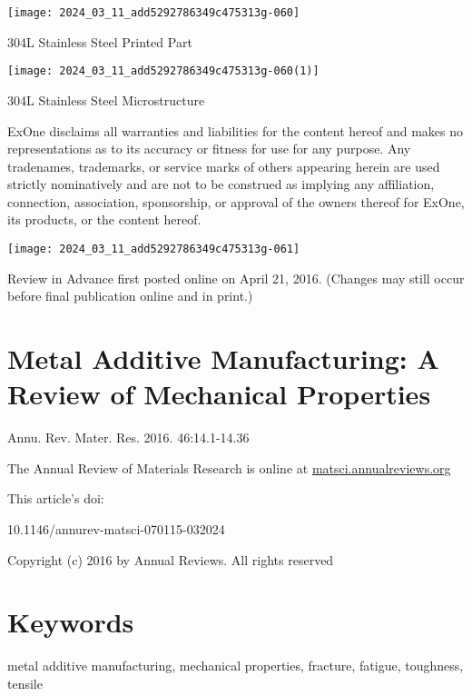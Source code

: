 \documentclass[10pt]{article}
\begin{document}
\begin{center}
\texttt{[image: 2024\_03\_11\_add5292786349c475313g-060]}
\end{center}

304L Stainless Steel Printed Part

\begin{center}
\texttt{[image: 2024\_03\_11\_add5292786349c475313g-060(1)]}
\end{center}

304L Stainless Steel Microstructure

ExOne disclaims all warranties and liabilities for the content hereof and makes no representations as to its accuracy or fitness for use for any purpose. Any tradenames, trademarks, or service marks of others appearing herein are used strictly nominatively and are not to be construed as implying any affiliation, connection, association, sponsorship, or approval of the owners thereof for ExOne, its products, or the content hereof.

\begin{center}
\texttt{[image: 2024\_03\_11\_add5292786349c475313g-061]}
\end{center}

Review in Advance first posted online on April 21, 2016. (Changes may still occur before final publication online and in print.)

\section*{Metal Additive Manufacturing: A Review of Mechanical Properties }
Annu. Rev. Mater. Res. 2016. 46:14.1-14.36

The Annual Review of Materials Research is online at \href{http://matsci.annualreviews.org}{matsci.annualreviews.org}

This article's doi:

10.1146/annurev-matsci-070115-032024

Copyright (c) 2016 by Annual Reviews. All rights reserved

\section*{Keywords}
metal additive manufacturing, mechanical properties, fracture, fatigue, toughness, tensile
\end{document}
